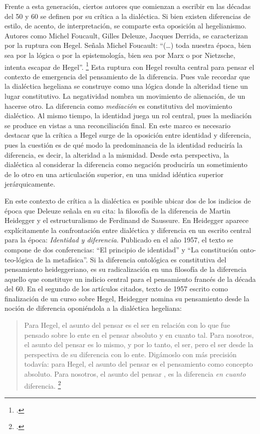 Frente a esta generación, ciertos autores que comienzan a escribir en las décadas del 50 y 60 se definen por su crítica a la dialéctica. Si bien existen diferencias de estilo, de acento, de interpretación, se comparte esta oposición al hegelianismo. Autores como Michel Foucault, Gilles Deleuze, Jacques Derrida, se caracterizan por la ruptura con Hegel. Señala Michel Foucault: \enquote{(\dots) toda nuestra época, bien sea por la lógica o por la epistemología, bien sea por Marx o por Nietzsche, intenta escapar de Hegel}. \footcite[59]{@6984-FOUCAULT1973} Esta ruptura con Hegel resulta central para pensar el contexto de emergencia del pensamiento de la diferencia. Pues vale recordar que la dialéctica hegeliana se construye como una lógica donde la alteridad tiene un lugar constitutivo. La negatividad nombra un movimiento de alienación, de un hacerse otro. La diferencia como \emph{mediación} es constitutiva del movimiento dialéctico. Al mismo tiempo, la identidad juega un rol central, pues la mediación se produce en vistas a una reconciliación final. En este marco es necesario destacar que la crítica a Hegel surge de la oposición entre identidad y diferencia, pues la cuestión es de qué modo la predominancia de la identidad reduciría la diferencia, es decir, la alteridad a la mismidad. Desde esta perspectiva, la dialéctica al considerar la diferencia como negación produciría un sometimiento de lo otro en una articulación superior, en una unidad idéntica superior jerárquicamente.

En este contexto de crítica a la dialéctica es posible ubicar dos de los indicios de época que Deleuze señala en su cita: la filosofía de la diferencia de Martin Heidegger y el estructuralismo de Ferdinand de Saussure. En Heidegger aparece explícitamente la confrontación entre dialéctica y diferencia en un escrito central para la época: \emph{Identidad y diferencia}. Publicado en el año 1957, el texto se compone de dos conferencias: \enquote{El principio de identidad} y \enquote{La constitución onto-teo-lógica de la metafísica}. Si la diferencia ontológica es constitutiva del pensamiento heideggeriano, es su radicalización en una filosofía de la diferencia aquello que constituye un indicio central para el pensamiento francés de la década del 60. En el segundo de los artículos citados, texto de 1957 escrito como finalización de un curso sobre Hegel, Heidegger nomina su pensamiento desde la noción de diferencia oponiéndola a la dialéctica hegeliana:

\begin{quote}
Para Hegel, el asunto del pensar es el ser en relación con lo que fue pensado sobre lo ente en el pensar absoluto y en cuanto tal. Para nosotros, el asunto del pensar es lo mismo, y por lo tanto, el ser, pero el ser desde la perspectiva de su diferencia con lo ente. Digámoslo con más precisión todavía: para Hegel, el asunto del pensar es el pensamiento como concepto absoluto. Para nosotros, el asunto del pensar , es la diferencia \emph{en cuanto} diferencia. \footcite[107]{@6965-HEIDEGGER1988}
\end{quote}

